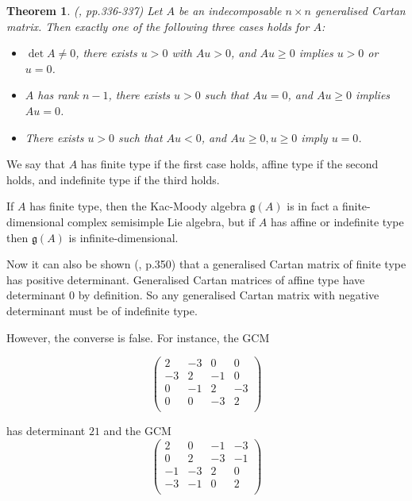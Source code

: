 \documentclass[11pt,a4paper]{report}
\newtheorem{theorem}{Theorem}[chapter]
\theoremstyle{definition}
\begin{document}
\begin{theorem} \label{thm:gcmclassification} (\cite{Carter}, pp.336-337) Let $A$ be an indecomposable $n \times n$ generalised Cartan matrix. Then exactly one of the following three cases holds for $A$: 

\begin{itemize}
    \item  $\det A \neq 0$, there exists $u > 0$ with $Au > 0$, and $Au \geq 0$ implies $u > 0$ or $u = 0$.

 \item  $A$ has rank $n-1$, there exists $u > 0$ such that $Au = 0$, and $Au \geq 0$ implies $Au = 0$.

 \item There exists $u > 0$ such that $Au < 0$, and $Au \geq 0, u \geq 0$ imply $u = 0$.
\end{itemize}
\end{theorem}
We say that $A$ has finite type if the first case holds, affine type if the second holds, and indefinite type if the third holds. 

If $A$ has finite type, then the Kac-Moody algebra $\mathfrak{g}(A)$ is in fact a finite-dimensional complex semisimple Lie algebra, but if $A$ has affine or indefinite type then $\mathfrak{g}(A)$ is infinite-dimensional. 

Now it can also be shown (\cite{Carter}, p.350) that a generalised Cartan matrix of finite type has positive determinant. Generalised Cartan matrices of affine type have determinant $0$ by definition. So any generalised Cartan matrix with negative determinant must be of indefinite type. 

However, the converse is false. For instance, the GCM 

\begin{equation*}\begin{pmatrix}
    2 & -3 & 0 & 0\\
    -3 & 2 & -1 & 0\\
    0 & -1 & 2 &-3\\
    0 & 0 & -3 & 2\\
\end{pmatrix}\end{equation*}

has determinant $21$ and the GCM 
\begin{equation*}\begin{pmatrix}
    2 & 0 & -1 & -3\\
    0 & 2 & -3 & -1\\
    -1 & -3 & 2 & 0\\
    -3 & -1 & 0 &2\\
\end{pmatrix}\end{equation*}
\end{document}
